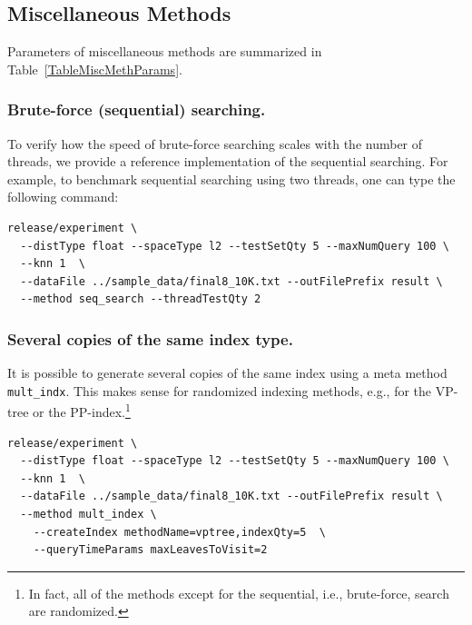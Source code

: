 \documentclass[runningheads,a4paper]{llncs}
\newcommand{\ttt}[1]{\texttt{#1}}
\begin{document}
\subsection{Miscellaneous Methods} \label{SectionMiscMeth}
Parameters of miscellaneous methods are summarized in Table~\ref{TableMiscMethParams}. 

\subsubsection{\textbf{Brute-force (sequential) searching}.}
To verify how the speed of brute-force searching
scales with the number of threads,
we provide a reference implementation of the sequential
searching.
For example, to benchmark sequential searching using two threads, 
one can type the following command:
{
\footnotesize
\begin{verbatim}
release/experiment \
  --distType float --spaceType l2 --testSetQty 5 --maxNumQuery 100 \
  --knn 1  \
  --dataFile ../sample_data/final8_10K.txt --outFilePrefix result \
  --method seq_search --threadTestQty 2
\end{verbatim}
}

\subsubsection{\textbf{Several copies of the same index type}.}
It is possible to generate several copies of the same index using a
meta method \ttt{mult\_indx}.
This makes sense for randomized indexing methods, e.g., for the VP-tree
or the PP-index.\footnote{In fact, all of the methods except for the sequential, i.e.,
brute-force, search are randomized.}

{
\footnotesize
\begin{verbatim}
release/experiment \
  --distType float --spaceType l2 --testSetQty 5 --maxNumQuery 100 \
  --knn 1  \
  --dataFile ../sample_data/final8_10K.txt --outFilePrefix result \
  --method mult_index \
    --createIndex methodName=vptree,indexQty=5  \
    --queryTimeParams maxLeavesToVisit=2
\end{verbatim}
}
\end{document}
